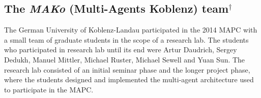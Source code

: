 \subsection{The \emph{MAKo} (Multi-Agents Koblenz) team$^\dagger$}
The German University of Koblenz-Landau participated in the 2014 MAPC with a small team of graduate students in the scope of a research lab.
The students who participated in research lab until its end were Artur Daudrich, Sergey Dedukh, Manuel Mittler, Michael Ruster, Michael Sewell and Yuan Sun.
The research lab consisted of an initial seminar phase and the longer project phase, where the students designed and implemented the multi-agent architecture used to participate in the MAPC.
